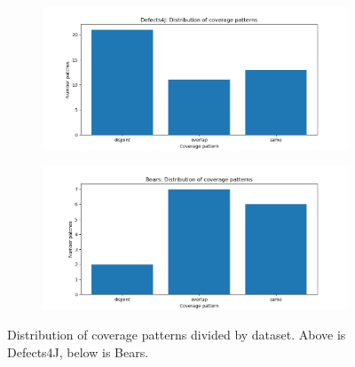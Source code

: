 \begin{figure}[h]
	\label{fig:coverage-datasets}
	\begin{subfigure}{\linewidth}
		\includegraphics[width=\linewidth]{img/coverage-d4j.png}
	\end{subfigure}
	\begin{subfigure}{\linewidth}
		\includegraphics[width=\linewidth]{img/coverage-bears.png}
	\end{subfigure}
	\caption{Distribution of coverage patterns divided by dataset. Above is 
	Defects4J, below is Bears.}
\end{figure}


